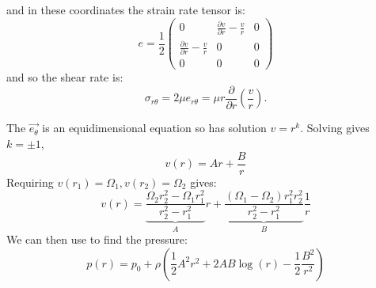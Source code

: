 \documentclass[../Main.tex]{subfiles}
\begin{document}
and in these coordinates the strain rate tensor is:
\begin{equation*}
    e = \frac12
    \begin{pmatrix}
        0 & \frac{\partial v}{\partial r} - \frac{v}{r} & 0 \\
        \frac{\partial v}{\partial r} - \frac{v}{r} & 0 & 0 \\
        0 & 0 & 0
    \end{pmatrix}
\end{equation*}
and so the shear rate is:
\begin{equation*}
    \sigma_{r\theta} = 2\mu e_{r\theta} = \mu r \frac{\partial }{\partial r} \left(\frac{v}{r}\right).
\end{equation*}

The $\vec{e_\theta}$  is an equidimensional equation so has solution $v = r^k$. Solving gives $k = \pm 1$,
\begin{equation*}
    v(r) = Ar + \frac{B}{r}
\end{equation*}
Requiring $v(r_1) = \Omega_1, v(r_2) = \Omega_2$ gives:
\begin{equation*}
    v(r) = \underbrace{\frac{\Omega_2 r_2^2 - \Omega_1r_1^2}{r_2^2 - r_1^2}}_A r + \underbrace{\frac{(\Omega_1 - \Omega_2)r_1^2 r_2^2}{r_2^2 - r_1^2}}_B \frac1r
\end{equation*}
We can then use  to find the pressure:
\begin{equation*}
    p(r) = p_0 + \rho \left(\frac12A^2 r^2 + 2AB\log(r) - \frac12 \frac{B^2}{r^2}\right)
\end{equation*}
\end{document}
